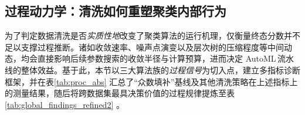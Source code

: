 \documentclass[10pt]{article} %
\numberwithin{equation}{section}
\begin{document}
\subsection{过程动力学：清洗如何重塑聚类内部行为}
\label{subsec:internal_tracking}

为了判定数据清洗是否\emph{实质性地}改变了聚类算法的运行机理，仅衡量终态分数并不足以支撑过程推断。诸如收敛速率、噪声点演变以及层次树的压缩程度等中间动态，均会直接影响后续参数搜索的收敛半径与计算预算，进而决定 AutoML 流水线的整体效益。基于此，本节以三大算法族的\emph{过程信号}为切入点，建立多指标诊断框架，并在表\ref{tab:proc_abs} 汇总了“众数填补”基线及其他清洗策略在上述指标上的测量结果，随后将跨数据集最具决策价值的过程规律提炼至表\ref{tab:global_findings_refined2} 。

\newcommand{\best}[1]{\textbf{#1}}
\newcommand{\worst}[1]{\uline{#1}}
\end{document}
